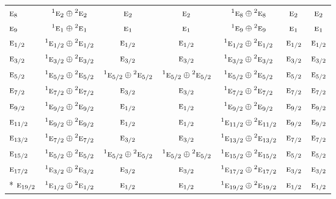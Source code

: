 \documentclass[10pt,a4paper]{article}
\numberwithin{equation}{section}
\newcommand{\irr}[1]{\text{\normalfont\scshape #1}}
\newcommand{\conjpair}[1]{{}^{#1}}
\begin{document}
{\begin{longtable}{@{}lcccccc@{}}
$\irr{e}_{8}$ & $\conjpair{1}\irr{e}_{2}\oplus \conjpair{2}\irr{e}_{2}$ & $\irr{e}_{2}$ & $\irr{e}_{2}$ & $\conjpair{1}\irr{e}_{8}\oplus \conjpair{2}\irr{e}_{8}$ & $\irr{e}_{2}$ & $\irr{e}_{2}$\\
$\irr{e}_{9}$ & $\conjpair{1}\irr{e}_{1}\oplus \conjpair{2}\irr{e}_{1}$ & $\irr{e}_{1}$ & $\irr{e}_{1}$ & $\conjpair{1}\irr{e}_{9}\oplus \conjpair{2}\irr{e}_{9}$ & $\irr{e}_{1}$ & $\irr{e}_{1}$\\
$\irr{e}_{1/2}$ & $\conjpair{1}\irr{e}_{1/2}\oplus \conjpair{2}\irr{e}_{1/2}$ & $\irr{e}_{1/2}$ & $\irr{e}_{1/2}$ & $\conjpair{1}\irr{e}_{1/2}\oplus \conjpair{2}\irr{e}_{1/2}$ & $\irr{e}_{1/2}$ & $\irr{e}_{1/2}$\\
$\irr{e}_{3/2}$ & $\conjpair{1}\irr{e}_{3/2}\oplus \conjpair{2}\irr{e}_{3/2}$ & $\irr{e}_{3/2}$ & $\irr{e}_{3/2}$ & $\conjpair{1}\irr{e}_{3/2}\oplus \conjpair{2}\irr{e}_{3/2}$ & $\irr{e}_{3/2}$ & $\irr{e}_{3/2}$\\
$\irr{e}_{5/2}$ & $\conjpair{1}\irr{e}_{5/2}\oplus \conjpair{2}\irr{e}_{5/2}$ & $\conjpair{1}\irr{e}_{5/2}\oplus \conjpair{2}\irr{e}_{5/2}$ & $\conjpair{1}\irr{e}_{5/2}\oplus \conjpair{2}\irr{e}_{5/2}$ & $\conjpair{1}\irr{e}_{5/2}\oplus \conjpair{2}\irr{e}_{5/2}$ & $\irr{e}_{5/2}$ & $\irr{e}_{5/2}$\\
$\irr{e}_{7/2}$ & $\conjpair{1}\irr{e}_{7/2}\oplus \conjpair{2}\irr{e}_{7/2}$ & $\irr{e}_{3/2}$ & $\irr{e}_{3/2}$ & $\conjpair{1}\irr{e}_{7/2}\oplus \conjpair{2}\irr{e}_{7/2}$ & $\irr{e}_{7/2}$ & $\irr{e}_{7/2}$\\
$\irr{e}_{9/2}$ & $\conjpair{1}\irr{e}_{9/2}\oplus \conjpair{2}\irr{e}_{9/2}$ & $\irr{e}_{1/2}$ & $\irr{e}_{1/2}$ & $\conjpair{1}\irr{e}_{9/2}\oplus \conjpair{2}\irr{e}_{9/2}$ & $\irr{e}_{9/2}$ & $\irr{e}_{9/2}$\\
$\irr{e}_{11/2}$ & $\conjpair{1}\irr{e}_{9/2}\oplus \conjpair{2}\irr{e}_{9/2}$ & $\irr{e}_{1/2}$ & $\irr{e}_{1/2}$ & $\conjpair{1}\irr{e}_{11/2}\oplus \conjpair{2}\irr{e}_{11/2}$ & $\irr{e}_{9/2}$ & $\irr{e}_{9/2}$\\
$\irr{e}_{13/2}$ & $\conjpair{1}\irr{e}_{7/2}\oplus \conjpair{2}\irr{e}_{7/2}$ & $\irr{e}_{3/2}$ & $\irr{e}_{3/2}$ & $\conjpair{1}\irr{e}_{13/2}\oplus \conjpair{2}\irr{e}_{13/2}$ & $\irr{e}_{7/2}$ & $\irr{e}_{7/2}$\\
$\irr{e}_{15/2}$ & $\conjpair{1}\irr{e}_{5/2}\oplus \conjpair{2}\irr{e}_{5/2}$ & $\conjpair{1}\irr{e}_{5/2}\oplus \conjpair{2}\irr{e}_{5/2}$ & $\conjpair{1}\irr{e}_{5/2}\oplus \conjpair{2}\irr{e}_{5/2}$ & $\conjpair{1}\irr{e}_{15/2}\oplus \conjpair{2}\irr{e}_{15/2}$ & $\irr{e}_{5/2}$ & $\irr{e}_{5/2}$\\
$\irr{e}_{17/2}$ & $\conjpair{1}\irr{e}_{3/2}\oplus \conjpair{2}\irr{e}_{3/2}$ & $\irr{e}_{3/2}$ & $\irr{e}_{3/2}$ & $\conjpair{1}\irr{e}_{17/2}\oplus \conjpair{2}\irr{e}_{17/2}$ & $\irr{e}_{3/2}$ & $\irr{e}_{3/2}$\\*
$\irr{e}_{19/2}$ & $\conjpair{1}\irr{e}_{1/2}\oplus \conjpair{2}\irr{e}_{1/2}$ & $\irr{e}_{1/2}$ & $\irr{e}_{1/2}$ & $\conjpair{1}\irr{e}_{19/2}\oplus \conjpair{2}\irr{e}_{19/2}$ & $\irr{e}_{1/2}$ & $\irr{e}_{1/2}$\\
\bottomrule\end{longtable}}
\end{document}
